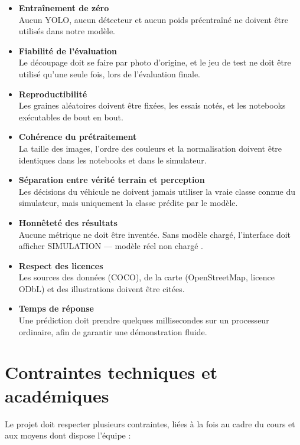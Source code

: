 \begin{itemize}
  \item \textbf{Entraînement de zéro}\\
  Aucun YOLO, aucun détecteur et aucun poids préentraîné ne doivent être utilisés dans notre modèle.
  \item \textbf{Fiabilité de l'évaluation}\\
  Le découpage doit se faire par photo d'origine, et le jeu de test ne doit être utilisé qu'une seule fois, lors de l'évaluation finale.
  \item \textbf{Reproductibilité}\\
  Les graines aléatoires doivent être fixées, les essais notés, et les notebooks exécutables de bout en bout.
  \item \textbf{Cohérence du prétraitement}\\
  La taille des images, l'ordre des couleurs et la normalisation doivent être identiques dans les notebooks et dans le simulateur.
  \item \textbf{Séparation entre vérité terrain et perception}\\
  Les décisions du véhicule ne doivent jamais utiliser la vraie classe connue du simulateur, mais uniquement la classe prédite par le modèle.
  \item \textbf{Honnêteté des résultats}\\
  Aucune métrique ne doit être inventée. Sans modèle chargé, l'interface doit afficher \og SIMULATION --- modèle réel non chargé \fg{}.
  \item \textbf{Respect des licences}\\
  Les sources des données (COCO), de la carte (OpenStreetMap, licence ODbL) et des illustrations doivent être citées.
  \item \textbf{Temps de réponse}\\
  Une prédiction doit prendre quelques millisecondes sur un processeur ordinaire, afin de garantir une démonstration fluide.
\end{itemize}

\section{Contraintes techniques et académiques}

Le projet doit respecter plusieurs contraintes, liées à la fois au cadre du cours et aux moyens dont dispose l'équipe :

